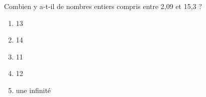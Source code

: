  Combien y a-t-il de nombres entiers compris entre 2,09 et 15,3 ?
 \begin{multicols}{5}
   \begin{enumerate}[A/]
   \item 13
   \item 14
   \item 11
   \item 12
   \item une infinité
   \end{enumerate}
 \end{multicols}
